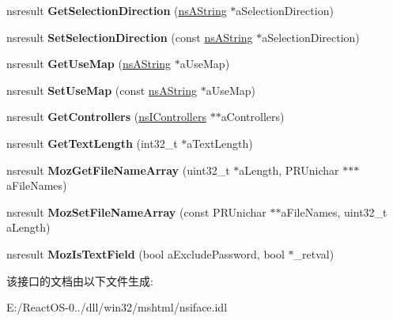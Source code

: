 \begin{DoxyCompactItemize}
nsresult {\bfseries Get\+Selection\+Direction} (\hyperlink{structns_string_container}{ns\+A\+String} $\ast$a\+Selection\+Direction)
\item 
\mbox{\label{interfacens_i_d_o_m_h_t_m_l_input_element_aeeeb0522ae0ac9735db5f98337f7327c}} 
nsresult {\bfseries Set\+Selection\+Direction} (const \hyperlink{structns_string_container}{ns\+A\+String} $\ast$a\+Selection\+Direction)
\item 
\mbox{\label{interfacens_i_d_o_m_h_t_m_l_input_element_aefc883777c12653a7e33446f790765d8}} 
nsresult {\bfseries Get\+Use\+Map} (\hyperlink{structns_string_container}{ns\+A\+String} $\ast$a\+Use\+Map)
\item 
\mbox{\label{interfacens_i_d_o_m_h_t_m_l_input_element_a3093f7bdd8be4810f3ce5461228226db}} 
nsresult {\bfseries Set\+Use\+Map} (const \hyperlink{structns_string_container}{ns\+A\+String} $\ast$a\+Use\+Map)
\item 
\mbox{\label{interfacens_i_d_o_m_h_t_m_l_input_element_a9ab70167705c9734406fb73d4370e62d}} 
nsresult {\bfseries Get\+Controllers} (\hyperlink{interfacens_i_supports}{ns\+I\+Controllers} $\ast$$\ast$a\+Controllers)
\item 
\mbox{\label{interfacens_i_d_o_m_h_t_m_l_input_element_a19178da2596048b861f5b456434dc24c}} 
nsresult {\bfseries Get\+Text\+Length} (int32\+\_\+t $\ast$a\+Text\+Length)
\item 
\mbox{\label{interfacens_i_d_o_m_h_t_m_l_input_element_a1b136c183cec9ec2394d9e834db31080}} 
nsresult {\bfseries Moz\+Get\+File\+Name\+Array} (uint32\+\_\+t $\ast$a\+Length, P\+R\+Unichar $\ast$$\ast$$\ast$a\+File\+Names)
\item 
\mbox{\label{interfacens_i_d_o_m_h_t_m_l_input_element_ab8873bc01086c3605709fa888f7fa906}} 
nsresult {\bfseries Moz\+Set\+File\+Name\+Array} (const P\+R\+Unichar $\ast$$\ast$a\+File\+Names, uint32\+\_\+t a\+Length)
\item 
\mbox{\label{interfacens_i_d_o_m_h_t_m_l_input_element_a97646e4455969f2b0b5f09e80cc0c8a9}} 
nsresult {\bfseries Moz\+Is\+Text\+Field} (bool a\+Exclude\+Password, bool $\ast$\+\_\+retval)
\end{DoxyCompactItemize}


该接口的文档由以下文件生成\+:\begin{DoxyCompactItemize}
\item 
E\+:/\+React\+O\+S-\/0../dll/win32/mshtml/nsiface.\+idl\end{DoxyCompactItemize}
